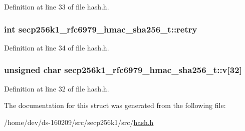 Definition at line 33 of file hash.\+h.

\hypertarget{structsecp256k1__rfc6979__hmac__sha256__t_a533be4a8cc6bf3112ca8c64cda3236a8}{}
\subsubsection[{retry}]{\setlength{\rightskip}{0pt plus 5cm}int secp256k1\+\_\+rfc6979\+\_\+hmac\+\_\+sha256\+\_\+t\+::retry}\label{structsecp256k1__rfc6979__hmac__sha256__t_a533be4a8cc6bf3112ca8c64cda3236a8}


Definition at line 34 of file hash.\+h.

\hypertarget{structsecp256k1__rfc6979__hmac__sha256__t_acce53d5308c7d406245a07e5dde49e78}{}
\subsubsection[{v}]{\setlength{\rightskip}{0pt plus 5cm}unsigned char secp256k1\+\_\+rfc6979\+\_\+hmac\+\_\+sha256\+\_\+t\+::v\mbox{[}32\mbox{]}}\label{structsecp256k1__rfc6979__hmac__sha256__t_acce53d5308c7d406245a07e5dde49e78}


Definition at line 32 of file hash.\+h.



The documentation for this struct was generated from the following file\+:\begin{DoxyCompactItemize}
\item 
/home/dev/ds-\/160209/src/secp256k1/src/\hyperlink{secp256k1_2src_2hash_8h}{hash.\+h}\end{DoxyCompactItemize}
